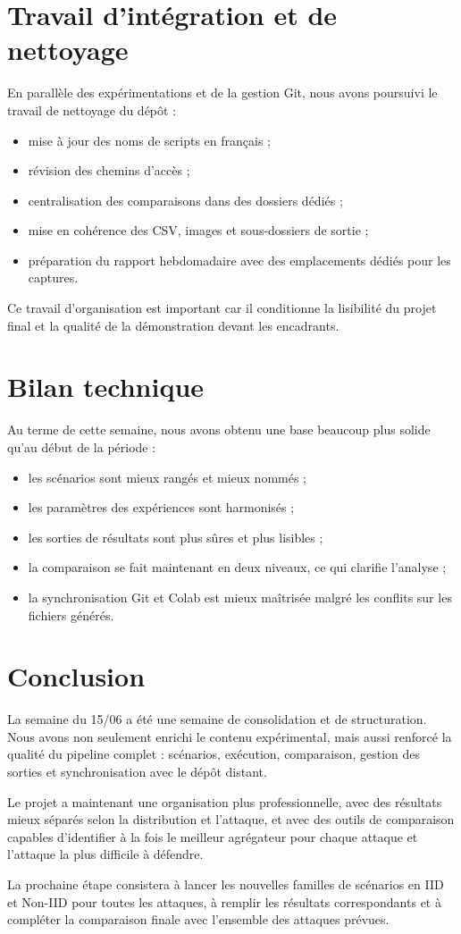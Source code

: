 \documentclass[11pt, a4paper]{article}
\begin{document}
\section{Travail d'intégration et de nettoyage}
En parallèle des expérimentations et de la gestion Git, nous avons poursuivi le travail de nettoyage du dépôt :
\begin{itemize}
    \item mise à jour des noms de scripts en français ;
    \item révision des chemins d'accès ;
    \item centralisation des comparaisons dans des dossiers dédiés ;
    \item mise en cohérence des CSV, images et sous-dossiers de sortie ;
    \item préparation du rapport hebdomadaire avec des emplacements dédiés pour les captures.
\end{itemize}

Ce travail d'organisation est important car il conditionne la lisibilité du projet final et la qualité de la démonstration devant les encadrants.

\section{Bilan technique}
Au terme de cette semaine, nous avons obtenu une base beaucoup plus solide qu'au début de la période :
\begin{itemize}
    \item les scénarios sont mieux rangés et mieux nommés ;
    \item les paramètres des expériences sont harmonisés ;
    \item les sorties de résultats sont plus sûres et plus lisibles ;
    \item la comparaison se fait maintenant en deux niveaux, ce qui clarifie l'analyse ;
    \item la synchronisation Git et Colab est mieux maîtrisée malgré les conflits sur les fichiers générés.
\end{itemize}

\section{Conclusion}
La semaine du 15/06 a été une semaine de consolidation et de structuration. Nous avons non seulement enrichi le contenu expérimental, mais aussi renforcé la qualité du pipeline complet : scénarios, exécution, comparaison, gestion des sorties et synchronisation avec le dépôt distant.

Le projet a maintenant une organisation plus professionnelle, avec des résultats mieux séparés selon la distribution et l'attaque, et avec des outils de comparaison capables d'identifier à la fois le meilleur agrégateur pour chaque attaque et l'attaque la plus difficile à défendre.

La prochaine étape consistera à lancer les nouvelles familles de scénarios en IID et Non-IID pour toutes les attaques, à remplir les résultats correspondants et à compléter la comparaison finale avec l'ensemble des attaques prévues.
\end{document}
